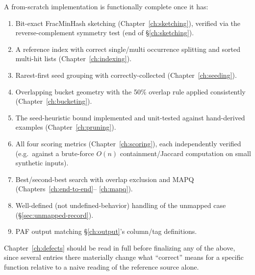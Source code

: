 A from-scratch implementation is functionally complete once it has:
\begin{enumerate}[nosep]
  \item Bit-exact FracMinHash sketching (Chapter~\ref{ch:sketching}), verified via the
    reverse-complement symmetry test (end of \S\ref{ch:sketching}).
  \item A reference index with correct single/multi occurrence splitting and sorted multi-hit
    lists (Chapter~\ref{ch:indexing}).
  \item Rarest-first seed grouping with correctly-collected  (Chapter~\ref{ch:seeding}).
  \item Overlapping bucket geometry with the 50\% overlap rule applied consistently
    (Chapter~\ref{ch:bucketing}).
  \item The seed-heuristic bound implemented and unit-tested against hand-derived examples
    (Chapter~\ref{ch:pruning}).
  \item All four scoring metrics (Chapter~\ref{ch:scoring}), each independently verified (e.g.\
    against a brute-force $O(n)$ containment/Jaccard computation on small synthetic inputs).
  \item Best/second-best search with overlap exclusion and MAPQ (Chapters~\ref{ch:end-to-end}--
    \ref{ch:mapq}).
  \item Well-defined (not undefined-behavior) handling of the unmapped case
    (\S\ref{sec:unmapped-record}).
  \item PAF output matching \S\ref{ch:output}'s column/tag definitions.
\end{enumerate}
Chapter~\ref{ch:defects} should be read in full before finalizing any of the above, since several
entries there materially change what ``correct'' means for a specific function relative to a
naive reading of the reference source alone.
